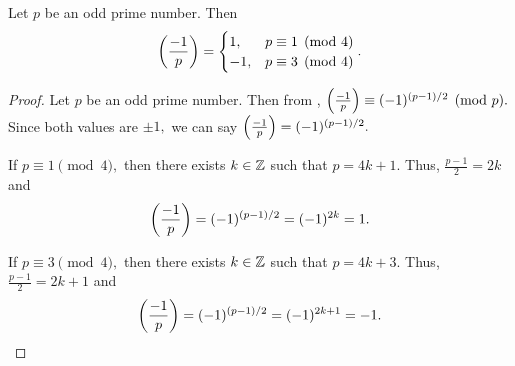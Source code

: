 \documentclass{ximera}
\begin{document}
\begin{theorem}\label{thm:residue-neg1}
	Let $p$ be an odd prime number. Then 
	\[
		\left(\frac{-1}{p}\right)=
			\begin{cases}
 				1, & p\equiv 1\pmod{4}\\
				-1, & p\equiv 3\pmod{4}
			\end{cases}.
	\]
	\begin{proof}
		Let $p$ be an odd prime number. Then from , $\left(\frac{-1}{p}\right)\equiv (-1)^{(p-1)/2}\pmod{p}.$ Since both values are $\pm1,$ we can say $\left(\frac{-1}{p}\right)=(-1)^{(p-1)/2}.$
	
		If $p\equiv 1\pmod{4},$ then there exists $k\in\mathbb Z$ such that $p=4k+1.$ Thus, $\frac{p-1}{2}=2k$ and 
			\[
				\left(\frac{-1}{p}\right)=(-1)^{(p-1)/2}=(-1)^{2k}=1.
			\]
		
		If $p\equiv 3\pmod{4},$ then there exists $k\in\mathbb Z$ such that $p=4k+3.$ Thus, $\frac{p-1}{2}=2k+1$ and 
			\[
				\left(\frac{-1}{p}\right)=(-1)^{(p-1)/2}=(-1)^{2k+1}=-1.
			\]
	\end{proof}
\end{theorem}


\end{document}

